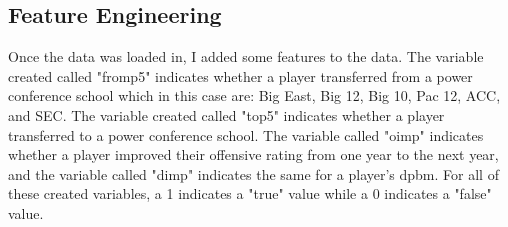 \documentclass[12pt]{article}
\begin{document}
\subsection{Feature Engineering}
\label{subsec:feature-eng}
Once the data was loaded in, I added some features to the data. The variable created called "fromp5" indicates whether a player transferred from a power conference school which in this case are: Big East, Big 12, Big 10, Pac 12, ACC, and SEC. The variable created called "top5" indicates whether a player transferred to a power conference school. The variable called "oimp" indicates whether a player improved their offensive rating from one year to the next year, and the variable called "dimp" indicates the same for a player's dpbm. For all of these created variables, a 1 indicates a "true" value while a 0 indicates a "false" value.
\end{document}
